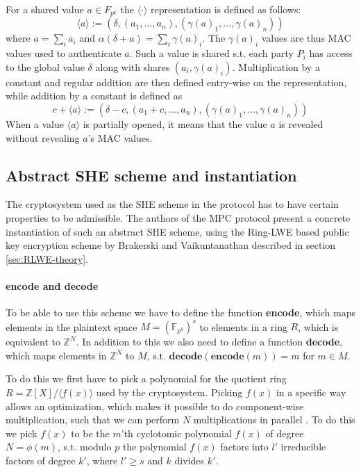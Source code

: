 \documentclass[../main.tex]{subfiles}
\begin{document}
For a shared value $a \in F_{p^k}$ the $\langle \cdot \rangle$ representation is defined as follows:
$$\langle a \rangle := (\delta, (a_1, ..., a_n), (\gamma(a)_1, ..., \gamma(a)_n))$$
where $a = \sum_i a_i$ and $\alpha (\delta + a) = \sum_i \gamma(a)_i$. The $\gamma(a)_i$ values are thus MAC values used to authenticate $a$. Such a value is shared s.t. each party $P_i$ has access to the global value $\delta$ along with shares $(a_i, \gamma(a)_i)$. Multiplication by a constant and regular addition are then defined entry-wise on the representation, while addition by a constant is defined as $$c + \langle a \rangle := (\delta - c, (a_1 + c, ..., a_n), (\gamma(a)_1, ..., \gamma(a)_n))$$
When a value $\langle a \rangle$ is partially opened, it means that the value $a$ is revealed without revealing $a$'s MAC values.

\subsection{Abstract SHE scheme and instantiation} \label{sec:abstract-she-theory}

The cryptosystem used as the SHE scheme in the protocol has to have certain properties to be admissible. The authors of the MPC protocol present a concrete instantiation of such an abstract SHE scheme, using the Ring-LWE based public key encryption scheme by Brakerski and Vaikuntanathan \cite{brakerski2011fully} described in section \ref{sec:RLWE-theory}.

\paragraph{encode and decode}
To be able to use this scheme we have to define the function \textbf{encode}, which maps elements in the plaintext space $M = (\mathbb{F}_{p^k})^s$ to elements in a ring $R$, which is equivalent to $\mathbb{Z}^N$. In addition to this we also need to define a function \textbf{decode}, which maps elements in $\mathbb{Z}^N$ to $M$, s.t. $\textbf{decode}(\textbf{encode}(m)) = m$ for $m \in M$.

To do this we first have to pick a polynomial for the quotient ring $R = \mathbb{Z}[X]/\langle f(x) \rangle$ used by the cryptosystem. Picking $f(x)$ in a specific way allows an optimization, which makes it possible to do component-wise multiplication, such that we can perform $N$ multiplications in parallel \cite{damgaard2012multiparty}.
To do this we pick $f(x)$ to be the $m$'th cyclotomic polynomial $f(x)$ of degree $N = \phi(m)$, s.t. modulo $p$ the polynomial $f(x)$ factors into $l'$ irreducible factors of degree $k'$, where $l' \geq s$ and $k$ divides $k'$.
\end{document}
